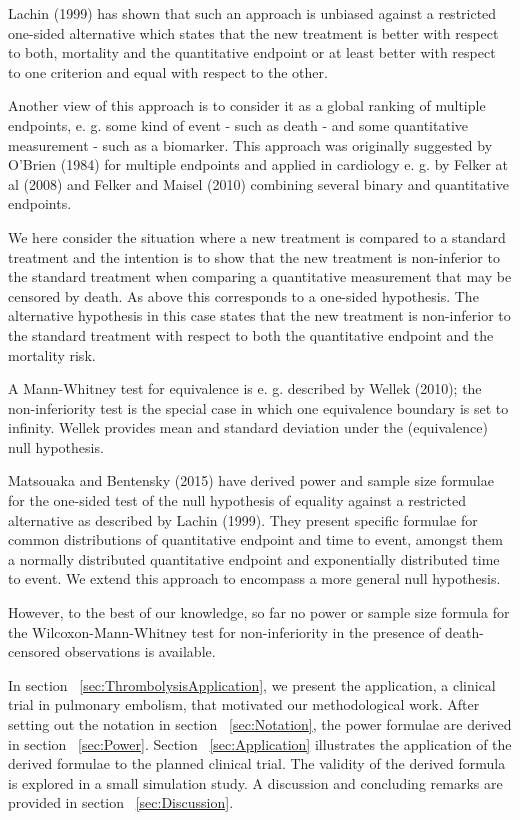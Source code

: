 \documentclass[bimj,fleqn]{w-art}\usepackage[]{graphicx}\usepackage[]{color}
\theoremstyle{plain}
\theoremstyle{definition}
\begin{document}
Lachin (1999) has shown that such an approach is unbiased against a restricted
one-sided alternative which states that the new treatment is better with
respect to both, mortality and the quantitative endpoint or at least better
with respect to one criterion and equal with respect to the other.

Another view of this approach is to consider it as a global ranking of
multiple endpoints, e. g. some kind of event - such as death - and some
quantitative measurement - such as a biomarker. This approach was originally
suggested by O'Brien (1984) for multiple endpoints and applied in cardiology
e. g. by Felker at al (2008) and Felker and Maisel (2010) combining several
binary and quantitative endpoints.

We here consider the situation where a new treatment is compared to a standard
treatment and the intention is to show that the new treatment is non-inferior
to the standard treatment when comparing a quantitative measurement that may
be censored by death. As above this corresponds to a one-sided hypothesis.
The alternative hypothesis in this case states that the new treatment is
non-inferior to the standard treatment with respect to both the quantitative
endpoint and the mortality risk.

A Mann-Whitney test for equivalence is e. g. described by Wellek (2010); the
non-inferiority test is the special case in which one equivalence boundary is set
to infinity. Wellek provides mean and standard deviation under the (equivalence)
null hypothesis.

Matsouaka and Bentensky (2015) have derived power and sample size formulae for
the one-sided test of the null hypothesis of equality against a restricted
alternative as described by Lachin (1999). They present specific formulae for
common distributions of quantitative endpoint and time to event, amongst them
a normally distributed quantitative endpoint and exponentially distributed
time to event. We extend this approach to encompass a more general null
hypothesis.

However, to the best of our knowledge, so far no power or sample size formula
for the Wilcoxon-Mann-Whitney test for non-inferiority in the presence of
death-censored observations is available.

In section ~\ref{sec:ThrombolysisApplication}, we present the
application, a clinical trial in pulmonary embolism, that motivated our
methodological work. After setting out the notation in section
~\ref{sec:Notation}, the power formulae are derived in section ~\ref{sec:Power}.
Section ~\ref{sec:Application} illustrates the application of the derived
formulae to the planned clinical trial. The validity of the derived formula
is explored in a small simulation study. A discussion and concluding remarks
are provided in section ~\ref{sec:Discussion}.
\end{document}
